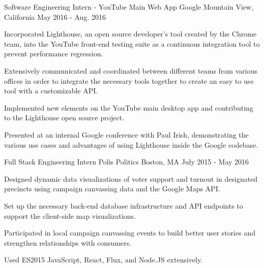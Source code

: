 


\begin{cventries}


\cventry
{Software Engineering Intern - YouTube Main Web App} %
{Google} %
{Mountain View, California} %
{May 2016 - Aug. 2016} %
{ %
\begin{cvitems}
\item {Incorporated Lighthouse, an open
source developer's tool created by the Chrome team, into the YouTube front-end
testing suite as a continuous integration tool to prevent performance
regression.}
\item {Extensively communicated and coordinated between
different teams from various offices in order to integrate the necessary tools
together to create an easy to use tool with a customizable API.}
\item {Implemented new elements on the YouTube main desktop app
and contributing to the Lighthouse open source project.}
\item {Presented at an internal Google conference with Paul Irish, demonstrating the various use
cases and advantages of using Lighthouse inside the Google codebase.}
\end{cvitems}
}


\cventry
{Full Stack Engineering Intern} %
{Polis Politics} %
{Boston, MA} %
{July 2015 - May 2016} %
{ %
\begin{cvitems}
\item{Designed dynamic data visualizations of voter support and turnout in
designated precincts using campaign canvassing data and the Google Maps API.}
\item {Set up the necessary back-end database infrastructure and API endpoints
to support the client-side map visualizations.}
\item {Participated in local campaign canvassing events to build better user
stories and strengthen relationships with consumers.}
\item {Used ES2015 JavaScript, React, Flux, and Node.JS extensively.}
\end{cvitems}
}


\end{cventries}
